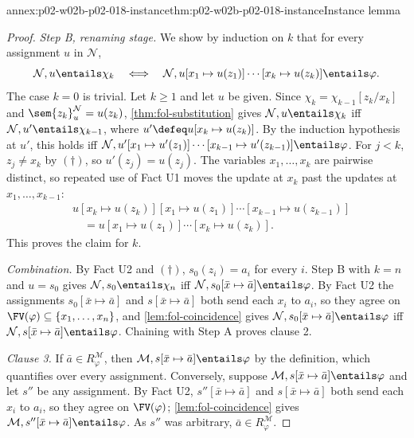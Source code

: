 \begin{annexitem}{annex:p02-w02b-p02-018-instance}{thm:p02-w02b-p02-018-instance}{Instance lemma}
\begin{proof}
\emph{Step B, renaming stage.}  We show by induction on \(k\) that for
every assignment \(u\) in \(\mathcal N\),
\[
 \mathcal N,u\entails\chi_k
 \quad\Longleftrightarrow\quad
 \mathcal N,u[x_1\mapsto u(z_1)]\cdots[x_k\mapsto u(z_k)]\entails\varphi .
\]
The case \(k=0\) is trivial.  Let \(k\geq1\) and let \(u\) be given.  Since
\(\chi_k=\chi_{k-1}[z_k/x_k]\) and \(\sem{z_k}^{\mathcal N}_u=u(z_k)\),
\cref{thm:fol-substitution} gives \(\mathcal N,u\entails\chi_k\) iff
\(\mathcal N,u'\entails\chi_{k-1}\), where
\(u'\defeq u[x_k\mapsto u(z_k)]\).  By the induction hypothesis at \(u'\),
this holds iff
\(\mathcal N,u'[x_1\mapsto u'(z_1)]\cdots[x_{k-1}\mapsto u'(z_{k-1})]
\entails\varphi\).  For \(j<k\), \(z_j\ne x_k\) by \((\dagger)\), so
\(u'(z_j)=u(z_j)\).  The variables \(x_1,\ldots,x_k\) are pairwise distinct,
so repeated use of Fact U1 moves the update at \(x_k\) past the updates at
\(x_1,\ldots,x_{k-1}\):
\[
 \begin{aligned}
 &u[x_k\mapsto u(z_k)][x_1\mapsto u(z_1)]\cdots[x_{k-1}\mapsto u(z_{k-1})]\\
 &\quad=u[x_1\mapsto u(z_1)]\cdots[x_k\mapsto u(z_k)].
 \end{aligned}
\]
This proves the claim for \(k\).

\emph{Combination.}  By Fact U2 and \((\dagger)\), \(s_0(z_i)=a_i\) for
every \(i\).  Step B with \(k=n\) and \(u=s_0\) gives
\(\mathcal N,s_0\entails\chi_n\) iff
\(\mathcal N,s_0[\bar x\mapsto\bar a]\entails\varphi\).  By Fact U2 the
assignments \(s_0[\bar x\mapsto\bar a]\) and \(s[\bar x\mapsto\bar a]\) both
send each \(x_i\) to \(a_i\), so they agree on
\(\FV(\varphi)\subseteq\{x_1,\ldots,x_n\}\), and
\cref{lem:fol-coincidence} gives
\(\mathcal N,s_0[\bar x\mapsto\bar a]\entails\varphi\) iff
\(\mathcal N,s[\bar x\mapsto\bar a]\entails\varphi\).  Chaining with Step A
proves clause 2.

\emph{Clause 3.}  If \(\bar a\in R^{\mathcal M}_{\varphi}\), then
\(\mathcal M,s[\bar x\mapsto\bar a]\entails\varphi\) by the definition,
which quantifies over every assignment.  Conversely, suppose
\(\mathcal M,s[\bar x\mapsto\bar a]\entails\varphi\) and let \(s''\) be any
assignment.  By Fact U2, \(s''[\bar x\mapsto\bar a]\) and
\(s[\bar x\mapsto\bar a]\) both send each \(x_i\) to \(a_i\), so they agree
on \(\FV(\varphi)\); \cref{lem:fol-coincidence} gives
\(\mathcal M,s''[\bar x\mapsto\bar a]\entails\varphi\).  As \(s''\) was
arbitrary, \(\bar a\in R^{\mathcal M}_{\varphi}\).
\end{proof}
\end{annexitem}

